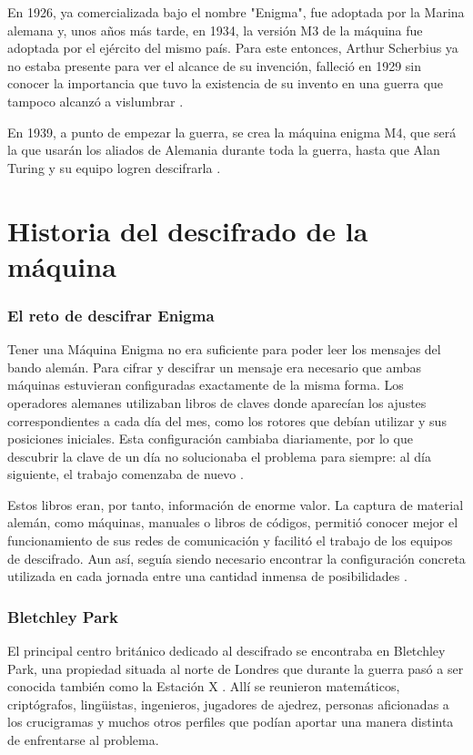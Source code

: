 En 1926, ya comercializada bajo el nombre "Enigma", fue adoptada por la Marina alemana y, unos años más tarde, en 1934, la versión M3 de la máquina fue adoptada por el ejército del mismo país. Para este entonces, Arthur Scherbius ya no estaba presente para ver el alcance de su invención, falleció en 1929 sin conocer la importancia que tuvo la existencia de su invento en una guerra que tampoco alcanzó a vislumbrar \cite{abc_scherbius}.


En 1939, a punto de empezar la guerra, se crea la máquina enigma M4, que será la que usarán los aliados de Alemania durante toda la guerra, hasta que Alan Turing y su equipo logren descifrarla \cite{devel_turing_enigma}.

\section {Historia del descifrado de la máquina}

\subsubsection {El reto de descifrar Enigma}

Tener una Máquina Enigma no era suficiente para poder leer los mensajes del bando alemán. Para cifrar y descifrar un mensaje era necesario que ambas máquinas estuvieran configuradas exactamente de la misma forma. Los operadores alemanes utilizaban libros de claves donde aparecían los ajustes correspondientes a cada día del mes, como los rotores que debían utilizar y sus posiciones iniciales. Esta configuración cambiaba diariamente, por lo que descubrir la clave de un día no solucionaba el problema para siempre: al día siguiente, el trabajo comenzaba de nuevo \cite{operation_turing_codebook}.


Estos libros eran, por tanto, información de enorme valor. La captura de material alemán, como máquinas, manuales o libros de códigos, permitió conocer mejor el funcionamiento de sus redes de comunicación y facilitó el trabajo de los equipos de descifrado. Aun así, seguía siendo necesario encontrar la configuración concreta utilizada en cada jornada entre una cantidad inmensa de posibilidades \cite{operation_turing_codebook}.


\subsubsection {Bletchley Park}

El principal centro británico dedicado al descifrado se encontraba en Bletchley Park, una propiedad situada al norte de Londres que durante la guerra pasó a ser conocida también como la Estación X \cite{devel_turing_enigma}. Allí se reunieron matemáticos, criptógrafos, lingüistas, ingenieros, jugadores de ajedrez, personas aficionadas a los crucigramas y muchos otros perfiles que podían aportar una manera distinta de enfrentarse al problema.


